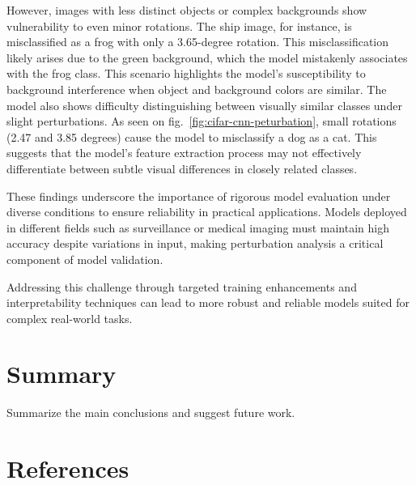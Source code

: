 \documentclass[journal, a4paper]{IEEEtran}
\begin{document}
However, images with less distinct objects or complex backgrounds show vulnerability to even minor rotations.
The ship image, for instance, is misclassified as a frog with only a 3.65-degree rotation.
This misclassification likely arises due to the green background, which the model mistakenly associates with the frog class.
This scenario highlights the model's susceptibility to background interference when object and background colors are similar.
The model also shows difficulty distinguishing between visually similar classes under slight perturbations.
As seen on fig.~\ref{fig:cifar-cnn-peturbation}, small rotations (2.47 and 3.85 degrees) cause the model to misclassify a dog as a cat.
This suggests that the model's feature extraction process may not effectively differentiate between subtle visual differences in closely related classes.

These findings underscore the importance of rigorous model evaluation under diverse conditions to ensure reliability in practical applications.
Models deployed in different fields such as surveillance or medical imaging must maintain high accuracy despite variations in input, making perturbation analysis a critical component of model validation.

Addressing this challenge through targeted training enhancements and interpretability techniques can lead to more robust and reliable models suited for complex real-world tasks.

\section{Summary}\label{sec:summary}
Summarize the main conclusions and suggest future work.

\section{References}\label{sec:references}



\end{document}

